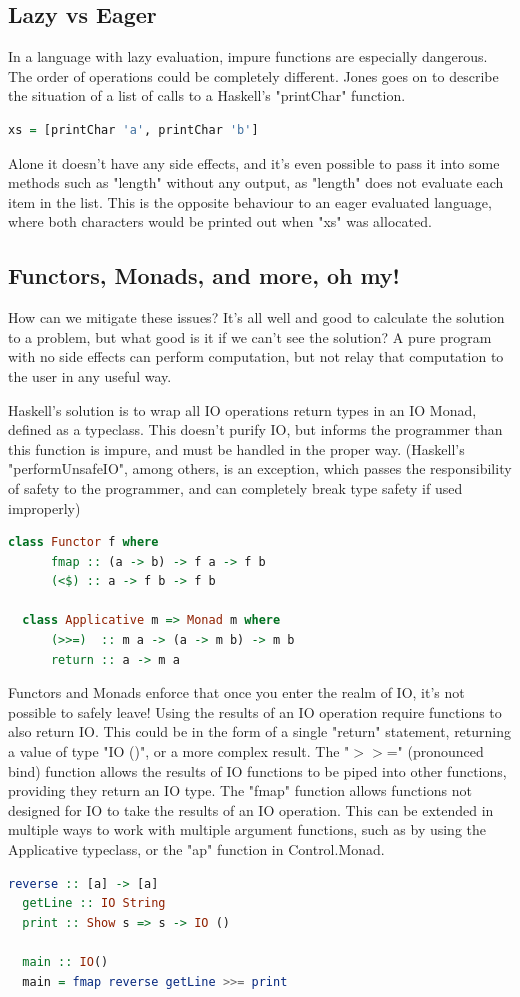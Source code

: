 \documentclass[a4paper]{article}
\begin{document}
\subsection{Lazy vs Eager}
In a language with lazy evaluation, impure functions are especially dangerous. The order of operations could be completely different. Jones goes on to describe the situation of a list of calls to a Haskell's "printChar" function.
\begin{lstlisting}[language=haskell, caption=An example of lazy evaluation gone awry with IO.]
  xs = [printChar 'a', printChar 'b']
\end{lstlisting}
Alone it doesn't have any side effects, and it's even possible to pass it into some methods such as "length" without any output, as "length" does not evaluate each item in the list.
This is the opposite behaviour to an eager evaluated language, where both characters would be printed out when "xs" was allocated. 
\subsection{Functors, Monads, and more, oh my!}
How can we mitigate these issues? It's all well and good to calculate the solution to a problem, but what good is it if we can't see the solution? A pure program with no side effects can perform computation, but not relay that computation to the user in any useful way.

Haskell's solution is to wrap all IO operations return types in an IO Monad, defined as a typeclass. This doesn't purify IO, but informs the programmer than this function is impure, and must be handled in the proper way. (Haskell's "performUnsafeIO", among others, is an exception, which passes the responsibility of safety to the programmer, and can completely break type safety if used improperly)
\begin{lstlisting}[language=haskell, caption=Haskell's Functor and Monad typeclasses.]
  class Functor f where
      fmap :: (a -> b) -> f a -> f b
      (<$) :: a -> f b -> f b
        
  class Applicative m => Monad m where
      (>>=)  :: m a -> (a -> m b) -> m b
      return :: a -> m a
\end{lstlisting}
Functors and Monads enforce that once you enter the realm of IO, it's not possible to safely leave! Using the results of an IO operation require functions to also return IO.
This could be in the form of a single "return" statement, returning a value of type "IO ()", or a more complex result.
The "$>>$=" (pronounced bind) function allows the results of IO functions to be piped into other functions, providing they return an IO type.
The "fmap" function allows functions not designed for IO to take the results of an IO operation. This can be extended in multiple ways to work with multiple argument functions, such as by using the Applicative typeclass, or the "ap" function in Control.Monad.
\begin{lstlisting}[language=haskell, caption=fmap and bind allow IO operations to be used safely]
  reverse :: [a] -> [a]
  getLine :: IO String
  print :: Show s => s -> IO ()

  main :: IO()
  main = fmap reverse getLine >>= print
\end{lstlisting}
\end{document}
